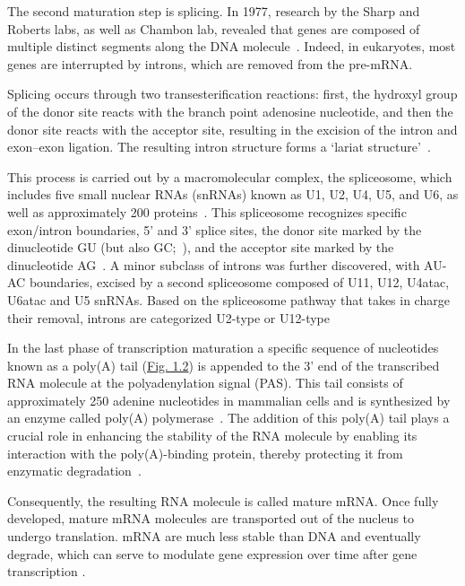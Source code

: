 The second maturation step is splicing. In 1977, research by the Sharp and Roberts labs, as well as Chambon lab, revealed that genes are composed of multiple distinct segments along the DNA molecule~\citep{berget_spliced_1977, breathnach_ovalbumin_1977, breathnach_organization_1981, berk_discovery_2016, suran_finding_2020}. Indeed, in eukaryotes, most genes are interrupted by introns, which are removed from the pre-\acrshort{mRNA}. 

Splicing occurs through two transesterification reactions: first, the hydroxyl group of the donor site reacts with the branch point adenosine nucleotide, and then the donor site reacts with the acceptor site, resulting in the excision of the intron and exon–exon ligation. The resulting intron structure forms a `lariat structure'~\citep{proudfoot_integrating_2002}.

This process is carried out by a macromolecular complex, the spliceosome, which includes five small nuclear RNAs (snRNAs) known as U1, U2, U4, U5, and U6, as well as approximately 200 proteins~\citep{lerner_are_1980, mount_recognizing_2015}. This spliceosome recognizes specific exon/intron boundaries, 5' and 3' splice sites, the donor site marked by the dinucleotide GU (but also GC;~\citet{aebi_5_1987}), and the acceptor site marked by the dinucleotide AG~\citep{breathnach_ovalbumin_1978}. A minor subclass of introns was further discovered, with AU-AC boundaries, excised by a second spliceosome composed of U11, U12, U4atac, U6atac and U5 snRNAs. Based on the spliceosome pathway that takes in charge their removal, introns are categorized U2-type or U12-type~\citep{sharp_classification_1997}

In the last phase of transcription maturation a specific sequence of nucleotides known as a poly(A) tail (\hyperref[fig:genestructure]{Fig. 1.2}) is appended to the 3' end of the transcribed RNA molecule at the polyadenylation signal (PAS). This tail consists of approximately 250 adenine nucleotides in mammalian cells and is synthesized by an enzyme called poly(A) polymerase~\citep{xiang_molecular_2021}. The addition of this poly(A) tail plays a crucial role in enhancing the stability of the RNA molecule by enabling its interaction with the poly(A)-binding protein, thereby protecting it from enzymatic degradation~\citep{preiss_end_2013, nicholson_tales_2019, passmore_roles_2022}. 

Consequently, the resulting RNA molecule is called mature \acrshort{mRNA}. Once fully developed, mature \acrshort{mRNA} molecules are transported out of the nucleus to undergo translation. mRNA are much less stable than DNA and eventually degrade, which can serve to modulate gene expression over time after gene transcription \citep{ross_mRNA_1995, wang_origins_1995, fordyce_long-term_2013}. 

